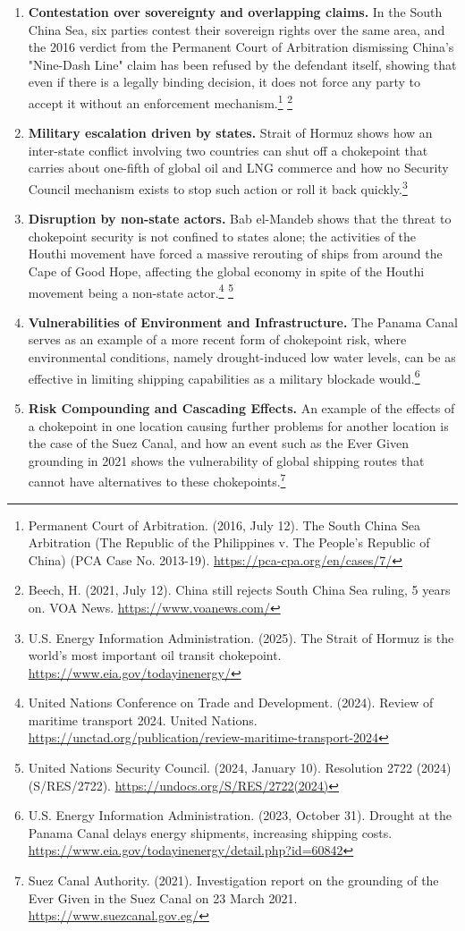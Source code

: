 \begin{enumerate}
  \item \textbf{Contestation over sovereignty and overlapping claims.} In the South China Sea, six parties contest their sovereign rights over the same area, and the 2016 verdict from the Permanent Court of Arbitration dismissing China's "Nine-Dash Line" claim has been refused by the defendant itself, showing that even if there is a legally binding decision, it does not force any party to accept it without an enforcement mechanism.\footnote{Permanent Court of Arbitration. (2016, July 12). The South China Sea Arbitration (The Republic of the Philippines v. The People's Republic of China) (PCA Case No. 2013-19). \url{https://pca-cpa.org/en/cases/7/}} \footnote{Beech, H. (2021, July 12). China still rejects South China Sea ruling, 5 years on. VOA News. \url{https://www.voanews.com/}}
  \item \textbf{Military escalation driven by states.} Strait of Hormuz shows how an inter-state conflict involving two countries can shut off a chokepoint that carries about one-fifth of global oil and LNG commerce and how no Security Council mechanism exists to stop such action or roll it back quickly.\footnote{U.S. Energy Information Administration. (2025). The Strait of Hormuz is the world's most important oil transit chokepoint. \url{https://www.eia.gov/todayinenergy/}}
  \item \textbf{Disruption by non-state actors.} Bab el-Mandeb shows that the threat to chokepoint security is not confined to states alone; the activities of the Houthi movement have forced a massive rerouting of ships from around the Cape of Good Hope, affecting the global economy in spite of the Houthi movement being a non-state actor.\footnote{United Nations Conference on Trade and Development. (2024). Review of maritime transport 2024. United Nations. \url{https://unctad.org/publication/review-maritime-transport-2024}} \footnote{United Nations Security Council. (2024, January 10). Resolution 2722 (2024) (S/RES/2722). \url{https://undocs.org/S/RES/2722(2024)}}
  \item \textbf{Vulnerabilities of Environment and Infrastructure.} The Panama Canal serves as an example of a more recent form of chokepoint risk, where environmental conditions, namely drought-induced low water levels, can be as effective in limiting shipping capabilities as a military blockade would.\footnote{U.S. Energy Information Administration. (2023, October 31). Drought at the Panama Canal delays energy shipments, increasing shipping costs. \url{https://www.eia.gov/todayinenergy/detail.php?id=60842}}
  \item \textbf{Risk Compounding and Cascading Effects.} An example of the effects of a chokepoint in one location causing further problems for another location is the case of the Suez Canal, and how an event such as the Ever Given grounding in 2021 shows the vulnerability of global shipping routes that cannot have alternatives to these chokepoints.\footnote{Suez Canal Authority. (2021). Investigation report on the grounding of the Ever Given in the Suez Canal on 23 March 2021. \url{https://www.suezcanal.gov.eg/}}
\end{enumerate}

